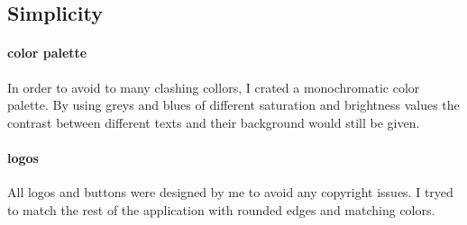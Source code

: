 \subsection{Simplicity}
\label{Simplicity}
\paragraph{color palette}
In order to avoid to many clashing collors, I crated a monochromatic color palette. By using greys and blues of different saturation and brightness values the contrast between different texts and their background would still be given.

\paragraph{logos}
All logos and buttons were designed by me to avoid any copyright issues. I tryed to match the rest of the application with rounded edges and matching colors.
